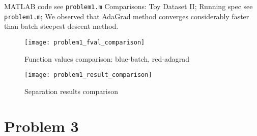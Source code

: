 \documentclass{article}
\begin{document}
MATLAB code see \verb|problem1.m|
\newline
Comparisons:
Toy Dataset II; Running spec see \verb|problem1.m|; We observed that AdaGrad method converges considerably faster than batch steepest descent method.
\begin{figure}
	\centering
	\texttt{[image: problem1\_fval\_comparison]}
	\caption{Function values comparison: blue-batch, red-adagrad}
	\label{fig:problem1fvalcomparison}
\end{figure}
\begin{figure}
	\centering
	\texttt{[image: problem1\_result\_comparison]}
	\caption{Separation results comparison}
	\label{fig:problem1resultcomparison}
\end{figure}


\section*{Problem 3}
\end{document}
